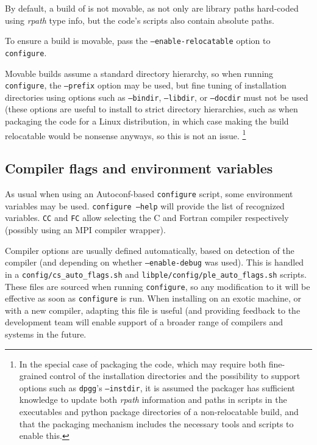 \documentclass[a4paper,10pt,twoside]{csshortdoc}
\begin{document}
By default, a build of \CS is not movable, as not only
are library paths hard-coded using \emph{rpath} type info,
but the code's scripts also contain absolute paths.

To ensure a build is movable, pass the \texttt{--enable-relocatable} option
to {\tt configure}.

Movable builds assume a standard directory hierarchy, so when running
{\tt configure}, the \texttt{--prefix} option may be used, but fine tuning
of installation directories using options such as \texttt{--bindir},
\texttt{--libdir}, or \texttt{--docdir} must not be used
(these options are useful to install to strict directory hierarchies,
such as when packaging the code for a Linux distribution,
in which case making the build relocatable would be nonsense anyways,
so this is not an issue.
\footnote{In the special case of packaging the code, which
may require both fine-grained control of the installation directories
and the possibility to support options such as \texttt{dpgg}'s
\texttt{--instdir}, it is assumed the packager has sufficient knowledge to
update both \emph{rpath} information and paths in scripts in the executables
and python package directories of a non-relocatable build, and that the
packaging mechanism includes the necessary tools and scripts to enable this.}

\subsection{Compiler flags and environment variables\label{sec:config:flags}}

As usual when using an Autoconf-based \texttt{configure} script,
some environment variables may be used. \texttt{configure --help}
will provide the list of recognized variables.
\texttt{CC} and \texttt{FC} allow selecting the C and Fortran compiler
respectively (possibly using an MPI compiler wrapper).

Compiler options are usually defined automatically, based on
detection of the compiler (and depending on whether \texttt{--enable-debug}
was used). This is handled in a \texttt{config/cs\_auto\_flags.sh}
and \texttt{libple/config/ple\_auto\_flags.sh} scripts.
These files are sourced when running \texttt{configure}, so
any modification to it will be effective as soon as \texttt{configure} is run.
When installing on an exotic machine, or with a new compiler, adapting this
file is useful (and providing feedback to the \CS development team
will enable support of a broader range of compilers and systems in the
future.
\end{document}
